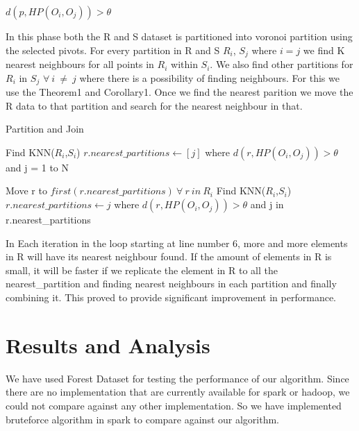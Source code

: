 \documentclass[conference]{IEEEtran}
\begin{document}
\medskip

$d(p, HP(O_i, O_j)) > \theta $

\medskip

In this phase both the R and S dataset is partitioned into voronoi
partition using the selected pivots. For every partition in R and S $R_i$,
$S_j$ where $i=j$ we find K nearest neighbours for all points in
$R_i$ within $S_i$. We also find other partitions for $R_i$ in $S_j$
$\forall\ i\ \neq\ j$ where there is a possibility of finding
neighbours. For this we use the Theorem1 and Corollary1.
Once we find the nearest parition we move the R data to that partition
and search for the nearest neighbour in that.

\begin{algorithm}
  \caption{Partition and Join}
  \label{algo_join}
  \begin{algorithmic}[1]

    \STATE Find KNN($R_i$,$S_i$)
    \STATE $r.nearest\_partitions \leftarrow [j]$
    \STATE where $d(r, HP(O_i, O_j)) > \theta$ and j = 1 to N
    \ENDFOR

    \STATE Move r to $first(r.nearest\_partitions)\ \forall\ r\ in\ R_i$
    \REPEAT
    \STATE Find KNN($R_i$,$S_i$)
    \STATE $r.nearest\_partitions \leftarrow j$
    \STATE where $d(r, HP(O_i, O_j)) > \theta$  and j in r.nearest\_partitions
    \ENDFOR

  \end{algorithmic}
\end{algorithm}

\bigskip

In Each iteration in the loop starting at line number 6, more and more elements in R will have its nearest
neighbour found. If the amount of elements in R is small, it will be
faster if we replicate the element in R to all the nearest\_partition
and finding nearest neighbours in each partition and finally combining
it. This proved to provide significant improvement in performance.

\bigskip

\section{Results and Analysis}

We have used Forest Dataset for testing the performance of our
algorithm. Since there are no implementation that are currently
available for spark or hadoop, we could not compare against any other
implementation. So we have implemented bruteforce algorithm in spark to
compare against our algorithm.
\end{document}
